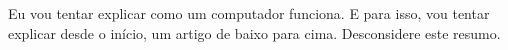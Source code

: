 \begin{resumo}
  Eu vou tentar explicar como um computador funciona.  E para isso,
vou tentar explicar desde o início, um artigo de baixo para cima.
Desconsidere este resumo.
\end{resumo}
